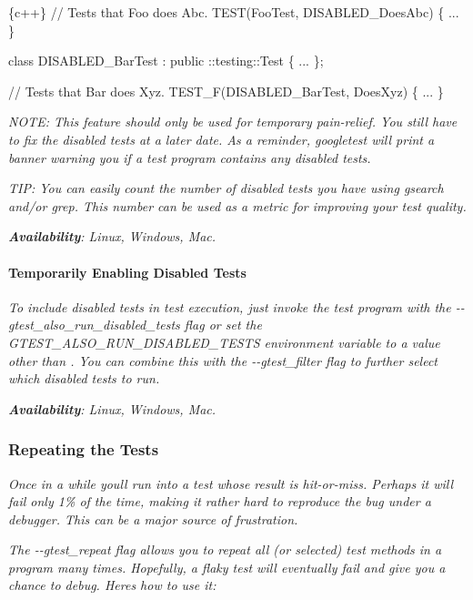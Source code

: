 {\itshape 
\begin{DoxyCode}
\{c++\}
// Tests that Foo does Abc.
TEST(FooTest, DISABLED\_DoesAbc) \{ ... \}

class DISABLED\_BarTest : public ::testing::Test \{ ... \};

// Tests that Bar does Xyz.
TEST\_F(DISABLED\_BarTest, DoesXyz) \{ ... \}
\end{DoxyCode}
}

{\itshape N\+O\+TE\+: This feature should only be used for temporary pain-\/relief. You still have to fix the disabled tests at a later date. As a reminder, googletest will print a banner warning you if a test program contains any disabled tests.}

{\itshape T\+IP\+: You can easily count the number of disabled tests you have using {\ttfamily gsearch} and/or {\ttfamily grep}. This number can be used as a metric for improving your test quality.}

{\itshape {\bfseries Availability}\+: Linux, Windows, Mac.}

{\itshape \paragraph*{Temporarily Enabling Disabled Tests}}

{\itshape }

{\itshape To include disabled tests in test execution, just invoke the test program with the {\ttfamily -\/-\/gtest\+\_\+also\+\_\+run\+\_\+disabled\+\_\+tests} flag or set the {\ttfamily G\+T\+E\+S\+T\+\_\+\+A\+L\+S\+O\+\_\+\+R\+U\+N\+\_\+\+D\+I\+S\+A\+B\+L\+E\+D\+\_\+\+T\+E\+S\+TS} environment variable to a value other than {}. You can combine this with the {\ttfamily -\/-\/gtest\+\_\+filter} flag to further select which disabled tests to run.}

{\itshape {\bfseries Availability}\+: Linux, Windows, Mac.}

{\itshape \subsubsection*{Repeating the Tests}}

{\itshape }

{\itshape Once in a while you\textquotesingle{}ll run into a test whose result is hit-\/or-\/miss. Perhaps it will fail only 1\% of the time, making it rather hard to reproduce the bug under a debugger. This can be a major source of frustration.}

{\itshape The {\ttfamily -\/-\/gtest\+\_\+repeat} flag allows you to repeat all (or selected) test methods in a program many times. Hopefully, a flaky test will eventually fail and give you a chance to debug. Here\textquotesingle{}s how to use it\+:}

